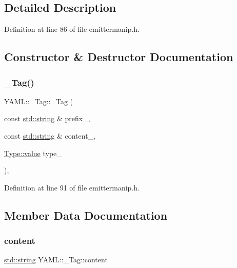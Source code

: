 \subsection{Detailed Description}


Definition at line 86 of file emittermanip.\+h.



\subsection{Constructor \& Destructor Documentation}
\mbox{\label{struct_y_a_m_l_1_1___tag_adb4050c5d32f6103bafd42b9c02df420}} 
\subsubsection{\texorpdfstring{\_Tag()}{\_Tag()}}
{\footnotesize\ttfamily Y\+A\+M\+L\+::\+\_\+\+Tag\+::\+\_\+\+Tag (\begin{DoxyParamCaption}\item[{const \mbox{\hyperlink{glad_8h_ac83513893df92266f79a515488701770}{std\+::string}} \&}]{prefix\+\_\+,  }\item[{const \mbox{\hyperlink{glad_8h_ac83513893df92266f79a515488701770}{std\+::string}} \&}]{content\+\_\+,  }\item[{\mbox{\hyperlink{struct_y_a_m_l_1_1___tag_1_1_type_a4bce10ea85e05e6d2424d3575e2bf53d}{Type\+::value}}}]{type\+\_\+ }\end{DoxyParamCaption})\hspace{0.3cm}{\ttfamily [inline]}, {\ttfamily [explicit]}}



Definition at line 91 of file emittermanip.\+h.



\subsection{Member Data Documentation}
\mbox{\label{struct_y_a_m_l_1_1___tag_a0ef0126c5858fd0e31e4f1c31f7f280b}} 
\subsubsection{\texorpdfstring{content}{content}}
{\footnotesize\ttfamily \mbox{\hyperlink{glad_8h_ac83513893df92266f79a515488701770}{std\+::string}} Y\+A\+M\+L\+::\+\_\+\+Tag\+::content}



